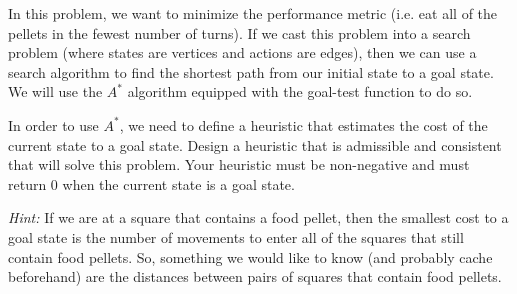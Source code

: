 \documentclass[11pt]{article}
\begin{document}
\noindent In this problem, we want to minimize the performance metric (i.e. eat all of the pellets in the fewest number of turns). If we cast this problem into a search problem (where states are vertices and actions are edges), then we can use a search algorithm to find the shortest path from our initial state to a goal state. We will use the $A^*$ algorithm equipped with the goal-test function to do so.\newline

\noindent In order to use $A^*$, we need to define a heuristic that estimates the cost of the current state to a goal state. Design a heuristic that is admissible and consistent that will solve this problem. Your heuristic must be non-negative and must return 0 when the current state is a goal state.\newline\newline

\noindent\textit{Hint:} If we are at a square that contains a food pellet, then the smallest cost to a goal state is the number of movements to enter all of the squares that still contain food pellets. So, something we would like to know (and probably cache beforehand) are the distances between pairs of squares that contain food pellets.
\end{document}
